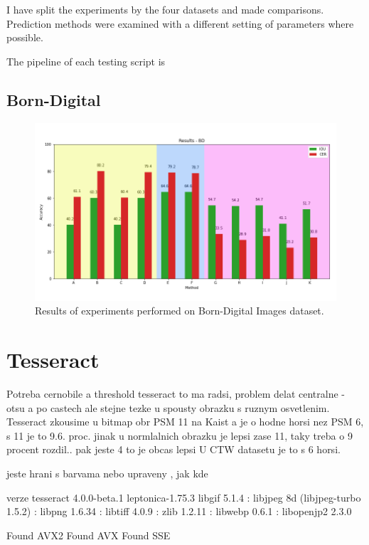 I have split the experiments by the four datasets and made comparisons. Prediction methods were examined with a different setting of parameters where possible.

The pipeline of each testing script is 

\subsection*{Born-Digital}



\begin{figure}[hbtp]
    \centering
    \includegraphics[scale=0.4]{obrazky/resBD-col.png}
    \caption{Results of experiments performed on Born-Digital Images dataset.}
    \label{Im:s}
\end{figure}


\section{Tesseract}
Potreba cernobile a threshold tesseract to ma radsi, problem delat centralne - otsu a po castech ale stejne tezke u spousty obrazku s ruznym osvetlenim.
Tesseract zkousime u bitmap obr PSM 11 na Kaist a je o hodne horsi nez PSM 6, s 11 je to 9.6. proc. jinak u normlalnich obrazku je lepsi zase 11, taky treba o 9 procent rozdil.. pak jeste 4 to je obcas lepsi
U CTW datasetu je to s 6 horsi.

jeste hrani s barvama nebo upraveny , jak kde

verze
tesseract 4.0.0-beta.1
 leptonica-1.75.3
  libgif 5.1.4 : libjpeg 8d (libjpeg-turbo 1.5.2) : libpng 1.6.34 : libtiff 4.0.9 : zlib 1.2.11 : libwebp 0.6.1 : libopenjp2 2.3.0

 Found AVX2
 Found AVX
 Found SSE

